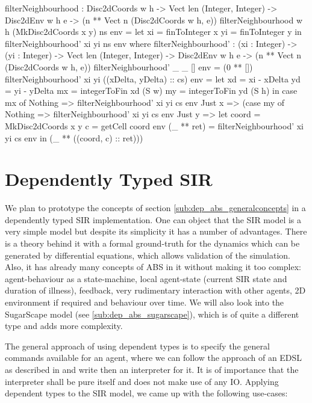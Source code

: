 \begin{HaskellCode}
filterNeighbourhood :  Disc2dCoords w h
                    -> Vect len (Integer, Integer)
                    -> Disc2dEnv w h e 
                    -> (n ** Vect n (Disc2dCoords w h, e))
filterNeighbourhood {w} {h} (MkDisc2dCoords x y) ns env =
    let xi = finToInteger x
        yi = finToInteger y
    in  filterNeighbourhood' xi yi ns env
  where
    filterNeighbourhood' :  (xi : Integer)
                         -> (yi : Integer)
                         -> Vect len (Integer, Integer)
                         -> Disc2dEnv w h e 
                         -> (n ** Vect n (Disc2dCoords w h, e))
    filterNeighbourhood' _ _ [] env = (0 ** [])
    filterNeighbourhood' xi yi ((xDelta, yDelta) :: cs) env 
      = let xd = xi - xDelta
            yd = yi - yDelta
            mx = integerToFin xd (S w)
            my = integerToFin yd (S h)
        in case mx of
            Nothing => filterNeighbourhood' xi yi cs env 
            Just x  => (case my of 
                        Nothing => filterNeighbourhood' xi yi cs env 
                        Just y  => let coord      = MkDisc2dCoords x y
                                       c          = getCell coord env
                                       (_ ** ret) = filterNeighbourhood' xi yi cs env
                                   in  (_ ** ((coord, c) :: ret)))
\end{HaskellCode}

\section{Dependently Typed SIR}
\label{sec:dep_abs_sir}
We plan to prototype the concepts of section \ref{sub:dep_abs_generalconcepts} in a dependently typed SIR implementation. One can object that the SIR model \cite{kermack_contribution_1927} is a very simple model but despite its simplicity it has a number of advantages. There is a theory behind it with a formal ground-truth for the dynamics which can be generated by differential equations, which allows validation of the simulation. Also, it has already many concepts of ABS in it without making it too complex: agent-behaviour as a state-machine, local agent-state (current SIR state and duration of illness), feedback, very rudimentary interaction with other agents, 2D environment if required and behaviour over time. We will also look into the SugarScape model (see \ref{sub:dep_abs_sugarscape}), which is of quite a different type and adds more complexity.

The general approach of using dependent types is to specify the general commands available for an agent, where we can follow the approach of an EDSL as described in \cite{brady_correct-by-construction_2010} and write then an interpreter for it. It is of importance that the interpreter shall be pure itself and does not make use of any IO. Applying dependent types to the SIR model, we came up with the following use-cases:


